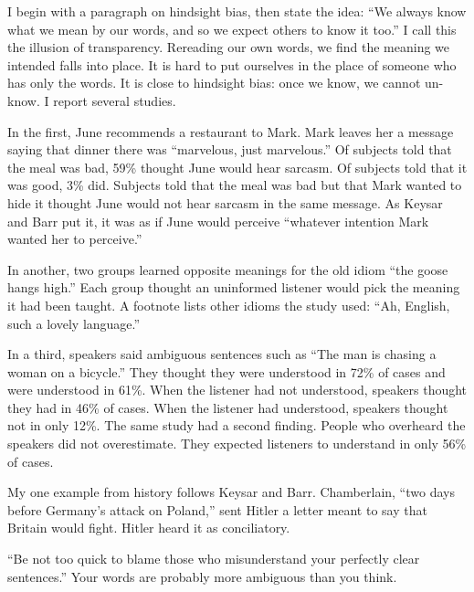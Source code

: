 
I begin with a paragraph on hindsight bias, then state the idea: ``We always know what we mean by our words, and so we expect others to know it too.'' I call this the illusion of transparency. Rereading our own words, we find the meaning we intended falls into place. It is hard to put ourselves in the place of someone who has only the words. It is close to hindsight bias: once we know, we cannot un-know. I report several studies.

In the first, June recommends a restaurant to Mark. Mark leaves her a message saying that dinner there was ``marvelous, just marvelous.'' Of subjects told that the meal was bad, 59\% thought June would hear sarcasm. Of subjects told that it was good, 3\% did. Subjects told that the meal was bad but that Mark wanted to hide it thought June would not hear sarcasm in the same message. As Keysar and Barr put it, it was as if June would perceive ``whatever intention Mark wanted her to perceive.''

In another, two groups learned opposite meanings for the old idiom ``the goose hangs high.'' Each group thought an uninformed listener would pick the meaning it had been taught. A footnote lists other idioms the study used: ``Ah, English, such a lovely language.''

In a third, speakers said ambiguous sentences such as ``The man is chasing a woman on a bicycle.'' They thought they were understood in 72\% of cases and were understood in 61\%. When the listener had not understood, speakers thought they had in 46\% of cases. When the listener had understood, speakers thought not in only 12\%. The same study had a second finding. People who overheard the speakers did not overestimate. They expected listeners to understand in only 56\% of cases. 

My one example from history follows Keysar and Barr. Chamberlain, ``two days before Germany's attack on Poland,'' sent Hitler a letter meant to say that Britain would fight. Hitler heard it as conciliatory. 

``Be not too quick to blame those who misunderstand your perfectly clear sentences.'' Your words are probably more ambiguous than you think. 
